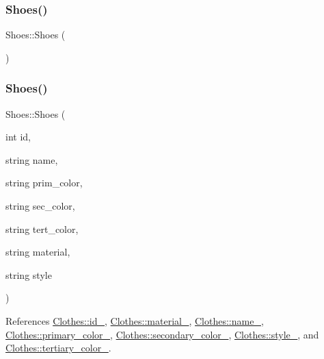 \subsubsection{\texorpdfstring{Shoes()}{Shoes()}\hspace{0.1cm}{\footnotesize\ttfamily [1/2]}}
{\footnotesize\ttfamily Shoes\+::\+Shoes (\begin{DoxyParamCaption}{ }\end{DoxyParamCaption})}

\mbox{\label{classShoes_a4f38fcd11c63cf3256c9688cf1bd19b3}} 
\subsubsection{\texorpdfstring{Shoes()}{Shoes()}\hspace{0.1cm}{\footnotesize\ttfamily [2/2]}}
{\footnotesize\ttfamily Shoes\+::\+Shoes (\begin{DoxyParamCaption}\item[{int}]{id,  }\item[{string}]{name,  }\item[{string}]{prim\+\_\+color,  }\item[{string}]{sec\+\_\+color,  }\item[{string}]{tert\+\_\+color,  }\item[{string}]{material,  }\item[{string}]{style }\end{DoxyParamCaption})}



References \mbox{\hyperlink{classClothes_a8978d931db5ca47c3ccea30def4ae83e}{Clothes\+::id\+\_\+}}, \mbox{\hyperlink{classClothes_adbb9ed311f14ccbb1e4fe0e8378a95d4}{Clothes\+::material\+\_\+}}, \mbox{\hyperlink{classClothes_a7f2275aaae24224d60c48af922c31b65}{Clothes\+::name\+\_\+}}, \mbox{\hyperlink{classClothes_a7cb005bf6cbb7f4eaa40f1b31817559c}{Clothes\+::primary\+\_\+color\+\_\+}}, \mbox{\hyperlink{classClothes_ab8f55f67b956b25d71260cffcf273673}{Clothes\+::secondary\+\_\+color\+\_\+}}, \mbox{\hyperlink{classClothes_aa85ed2b95110d8c477a1aca9cb403f98}{Clothes\+::style\+\_\+}}, and \mbox{\hyperlink{classClothes_a3c5f1e7ab531e3ba7a38b930da8078a0}{Clothes\+::tertiary\+\_\+color\+\_\+}}.

\mbox{\label{classShoes_afc511aaebac8e7ab57286cf35db7ce8f}} 
